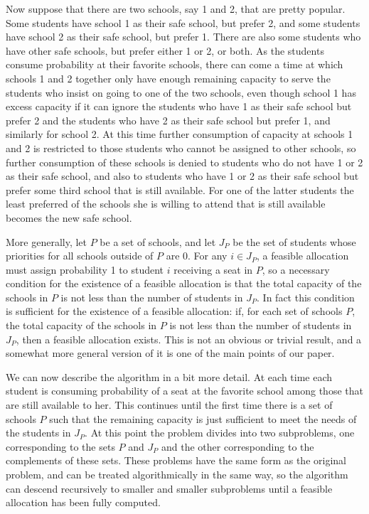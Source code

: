 \documentclass[12pt]{article}
\theoremstyle{definition}
\begin{document}
Now suppose that there are two schools, say 1 and 2, that are pretty
popular.  Some students have school 1 as their safe school, but prefer
2, and some students have school 2 as their safe school, but prefer 1.
There are also some students who have other safe schools, but prefer
either 1 or 2, or both.  As the students consume probability at their
favorite schools, there can come a time at which schools 1 and 2
together only have enough remaining capacity to serve the students who
insist on going to one of the two schools, even though school 1 has
excess capacity if it can ignore the students who have 1 as their safe
school but prefer 2 and the students who have 2 as their safe school
but prefer 1, and similarly for school 2.  At this time further
consumption of capacity at schools 1 and 2 is restricted to those
students who cannot be assigned to other schools, so further
consumption of these schools is denied to students who do not have 1
or 2 as their safe school, and also to students who have 1 or 2 as
their safe school but prefer some third school that is still
available.  For one of the latter students the least preferred of the
schools she is willing to attend that is still available becomes the
new safe school.

More generally, let $P$ be a set of schools, and let $J_P$ be the set
of students whose priorities for all schools outside of $P$ are 0.
For any $i \in J_P$, a feasible allocation must assign probability 1
to student $i$ receiving a seat in $P$, so a necessary condition for
the existence of a feasible allocation is that the total capacity of
the schools in $P$ is not less than the number of students in $J_P$.
In fact this condition is sufficient for the existence of a feasible
allocation: if, for each set of schools $P$, the total capacity of the
schools in $P$ is not less than the number of students in $J_P$, then
a feasible allocation exists.  This is not an obvious or trivial
result, and a somewhat more general version of it is one of the main
points of our paper.

We can now describe the algorithm in a bit more detail.  At each time
each student is consuming probability of a seat at the favorite school
among those that are still available to her.  This continues until the
first time there is a set of schools $P$ such that the remaining
capacity is just sufficient to meet the needs of the students in
$J_P$.  At this point the problem divides into two subproblems, one
corresponding to the sets $P$ and $J_P$ and the other corresponding to
the complements of these sets.  These problems have the same form as
the original problem, and can be treated algorithmically in the same
way, so the algorithm can descend recursively to smaller and smaller
subproblems until a feasible allocation has been fully computed.
\end{document}
